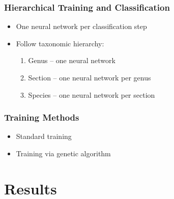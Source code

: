 \documentclass[]{beamer}
\begin{document}
    \begin{frame}
        \frametitle{Hierarchical Training and Classification}

        \begin{itemize}
            \item One neural network per classification step
            \item Follow taxonomic hierarchy:
            \begin{enumerate}
                \item Genus -- one neural network
                \item Section -- one neural network per genus
                \item Species -- one neural network per section

                \vspace{10 mm}

            \end{enumerate}
        \end{itemize}
    \end{frame}

    \begin{frame}
        \frametitle{Training Methods}

        \begin{itemize}
            \item Standard training
            \item Training via genetic algorithm
        \end{itemize}
    \end{frame}


\section{Results}
\end{document}
